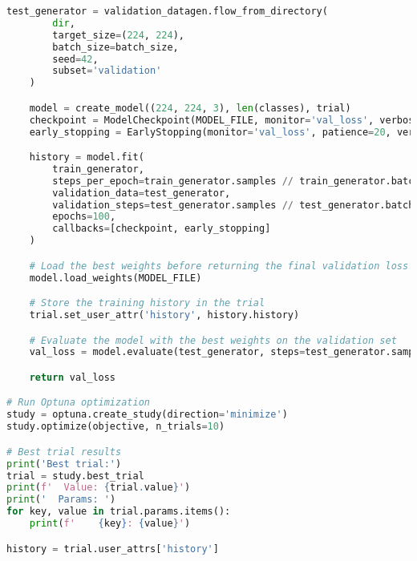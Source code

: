 \begin{lstlisting}[language=Python]
    test_generator = validation_datagen.flow_from_directory(
        dir,
        target_size=(224, 224),
        batch_size=batch_size,
        seed=42,
        subset='validation'
    )

    model = create_model((224, 224, 3), len(classes), trial)
    checkpoint = ModelCheckpoint(MODEL_FILE, monitor='val_loss', verbose=1, save_best_only=True, mode='min')
    early_stopping = EarlyStopping(monitor='val_loss', patience=20, verbose=1, restore_best_weights=True)

    history = model.fit(
        train_generator,
        steps_per_epoch=train_generator.samples // train_generator.batch_size,
        validation_data=test_generator,
        validation_steps=test_generator.samples // test_generator.batch_size,
        epochs=100,
        callbacks=[checkpoint, early_stopping]
    )

    # Load the best weights before returning the final validation loss
    model.load_weights(MODEL_FILE)

    # Store the training history in the trial
    trial.set_user_attr('history', history.history)

    # Evaluate the model with the best weights on the validation set
    val_loss = model.evaluate(test_generator, steps=test_generator.samples // batch_size, verbose=0)[0]

    return val_loss

# Run Optuna optimization
study = optuna.create_study(direction='minimize')
study.optimize(objective, n_trials=10)

# Best trial results
print('Best trial:')
trial = study.best_trial
print(f'  Value: {trial.value}')
print('  Params: ')
for key, value in trial.params.items():
    print(f'    {key}: {value}')

history = trial.user_attrs['history']
\end{lstlisting}
